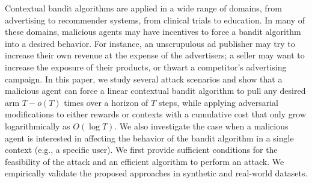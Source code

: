 \newcommand{\mtb}[1]{\textcolor{black}{#1}}
\newcommand{\otc}[1]{\textcolor{black}{#1}}
\newcommand{\changede}[1]{\textcolor{black}{#1}}
\newcommand{\changebr}[1]{\textcolor{black}{#1}}
\newcommand{\changelm}[1]{\textcolor{black}{#1}}
\newcommand{\changebrtwo}[1]{\textcolor{black}{#1}}
\newcommand{\changee}[1]{\textcolor{black}{#1}}
\newcommand{\cmmnt}[1]{\ignorespaces}


Contextual bandit algorithms are applied in a wide range of domains, from advertising to recommender systems, from clinical trials to education. In many of these domains, malicious agents may have incentives to {force a bandit algorithm into a desired behavior.} %
For instance, an unscrupulous ad publisher may try to increase their own revenue at the expense of the advertisers; a seller may want to increase the exposure of their products, or thwart a competitor's advertising campaign.
In this paper, we study several attack scenarios and show that a malicious agent can force a linear contextual bandit algorithm to pull any desired arm $T - o(T)$ times over a horizon of $T$ steps, while applying adversarial modifications to either rewards or contexts {with a cumulative cost} that only grow logarithmically as $O(\log T)$.
We also investigate the case when a malicious agent is interested in affecting the behavior of the bandit algorithm in a single context (e.g., a specific user). We first provide sufficient conditions for the feasibility of the attack and %
an efficient algorithm to perform an attack. %
{We empirically validate the proposed approaches in synthetic and real-world datasets.} %




















